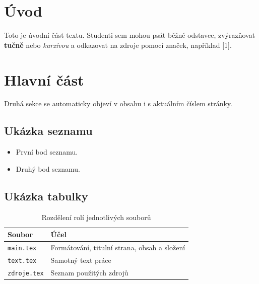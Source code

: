 \section{Úvod}
Toto je úvodní část textu. Studenti sem mohou psát běžné odstavce,
zvýrazňovat \textbf{tučně} nebo \emph{kurzívou} a odkazovat na zdroje
pomocí značek, například [1].

\section{Hlavní část}
Druhá sekce se automaticky objeví v obsahu i s aktuálním číslem stránky.

\subsection{Ukázka seznamu}
\begin{itemize}
  \item První bod seznamu.
  \item Druhý bod seznamu.
\end{itemize}

\subsection{Ukázka tabulky}
\begin{table}[h]
  \centering
  \begin{tabular}{ll}
    \toprule
    \textbf{Soubor} & \textbf{Účel} \\
    \midrule
    \texttt{main.tex} & Formátování, titulní strana, obsah a složení \\
    \texttt{text.tex} & Samotný text práce \\
    \texttt{zdroje.tex} & Seznam použitých zdrojů \\
    \bottomrule
  \end{tabular}
  \caption{Rozdělení rolí jednotlivých souborů}
\end{table}
